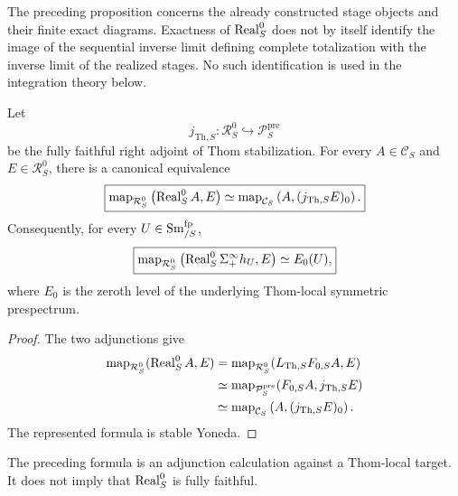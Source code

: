 \begin{remark}
\label{rem:monadic-de-rham-realization-no-complete-limit}
The preceding proposition concerns the already constructed stage objects and
their finite exact diagrams.  Exactness of \(\operatorname{Real}^{0}_S\) does not by itself
identify the image of the sequential inverse limit defining complete
totalization with the inverse limit of the realized stages.  No such
identification is used in the integration theory below.
\end{remark}

\begin{proposition}
\label{prop:monadic-de-rham-stabilized-level-zero-evaluation}
Let
\[
    j_{\mathrm{Th},S}:
    \mathcal R_S^0
    \hookrightarrow
    \mathcal P_S^{\mathrm{pre}}
\]
be the fully faithful right adjoint of Thom stabilization.  For every
\(A\in\mathcal C_S\) and \(E\in\mathcal R_S^0\), there is a canonical
equivalence
\[
\boxed{
    \operatorname{map}_{\mathcal R_S^0}
    \left(
        \operatorname{Real}^{0}_S A,E
    \right)
    \simeq
    \operatorname{map}_{\mathcal C_S}
    \left(
        A,(j_{\mathrm{Th},S}E)_0
    \right).
}
\]
Consequently, for every \(U\in\operatorname{Sm}^{\mathrm{fp}}_{/S}\),
\[
\boxed{
    \operatorname{map}_{\mathcal R_S^0}
    \left(
        \operatorname{Real}^{0}_S\Sigma^\infty_+h_U,E
    \right)
    \simeq
    E_0(U),
}
\]
where \(E_0\) is the zeroth level of the underlying Thom-local symmetric
prespectrum.
\end{proposition}

\begin{proof}
The two adjunctions give
\[
\begin{aligned}
    \operatorname{map}_{\mathcal R_S^0}(\operatorname{Real}^{0}_SA,E)
    &=
    \operatorname{map}_{\mathcal R_S^0}
    (L_{\mathrm{Th},S}F_{0,S}A,E)
    \\
    &\simeq
    \operatorname{map}_{\mathcal P_S^{\mathrm{pre}}}
    (F_{0,S}A,j_{\mathrm{Th},S}E)
    \\
    &\simeq
    \operatorname{map}_{\mathcal C_S}
    \left(
        A,(j_{\mathrm{Th},S}E)_0
    \right).
\end{aligned}
\]
The represented formula is stable Yoneda.
\end{proof}

\begin{remark}
\label{rem:monadic-de-rham-evaluation-not-full-faithfulness}
The preceding formula is an adjunction calculation against a Thom-local
target.  It does not imply that \(\operatorname{Real}^{0}_S\) is fully faithful.
\end{remark}

